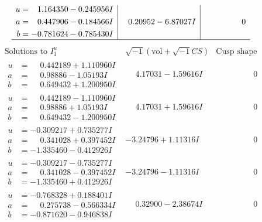 \documentclass[1p]{elsarticle_modified}
\theoremstyle{definition}
\newcommand{\I}{\sqrt{-1}}
\begin{document}
$$\begin{array}{c|c|c}
\begin{aligned}
u &= \phantom{-}1.164350 - 0.245956 I \\
a &= \phantom{-}0.447906 - 0.184566 I \\
b &= -0.781624 - 0.785430 I\end{aligned}
 & \phantom{-}0.20952 - 6.87027 I & \phantom{-0.000000 } 0\\
 \hline 
 \end{array}$$\newpage$$\begin{array}{c|c|c}  
\text{Solutions to }I^u_{1}& \I (\text{vol} + \sqrt{-1}CS) & \text{Cusp shape}\\
 \hline 
\begin{aligned}
u &= \phantom{-}0.442189 + 1.110960 I \\
a &= \phantom{-}0.98886 - 1.05193 I \\
b &= \phantom{-}0.649432 + 1.200950 I\end{aligned}
 & \phantom{-}4.17031 - 1.59616 I & \phantom{-0.000000 } 0 \\ \hline\begin{aligned}
u &= \phantom{-}0.442189 - 1.110960 I \\
a &= \phantom{-}0.98886 + 1.05193 I \\
b &= \phantom{-}0.649432 - 1.200950 I\end{aligned}
 & \phantom{-}4.17031 + 1.59616 I & \phantom{-0.000000 } 0 \\ \hline\begin{aligned}
u &= -0.309217 + 0.735277 I \\
a &= \phantom{-}0.341028 + 0.397452 I \\
b &= -1.335460 - 0.412926 I\end{aligned}
 & -3.24796 + 1.11316 I & \phantom{-0.000000 } 0 \\ \hline\begin{aligned}
u &= -0.309217 - 0.735277 I \\
a &= \phantom{-}0.341028 - 0.397452 I \\
b &= -1.335460 + 0.412926 I\end{aligned}
 & -3.24796 - 1.11316 I & \phantom{-0.000000 } 0 \\ \hline\begin{aligned}
u &= -0.768328 + 0.188401 I \\
a &= \phantom{-}0.275738 - 0.566334 I \\
b &= -0.871620 - 0.946838 I\end{aligned}
 & \phantom{-}0.32900 - 2.38674 I & \phantom{-0.000000 } 0 \\ \hline\begin{aligned}

\end{aligned}
\end{array}$$
\end{document}
